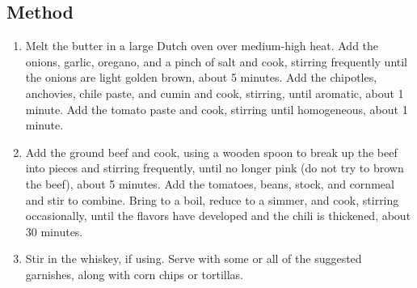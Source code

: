 \subsection{Method}

\begin{enumerate}
	\item Melt the butter in a large Dutch oven over medium-high heat. Add the onions, garlic, oregano, and a pinch of salt and cook, stirring frequently until the onions are light golden brown, about 5 minutes. Add the chipotles, anchovies, chile paste, and cumin and cook, stirring, until aromatic, about 1 minute. Add the tomato paste and cook, stirring until homogeneous, about 1 minute.
	\item Add the ground beef and cook, using a wooden spoon to break up the beef into pieces and stirring frequently, until no longer pink (do not try to brown the beef), about 5 minutes. Add the tomatoes, beans, stock, and cornmeal and stir to combine. Bring to a boil, reduce to a simmer, and cook, stirring occasionally, until the flavors have developed and the chili is thickened, about 30 minutes.
	\item Stir in the whiskey, if using. Serve with some or all of the suggested garnishes, along with corn chips or tortillas.
\end{enumerate}
